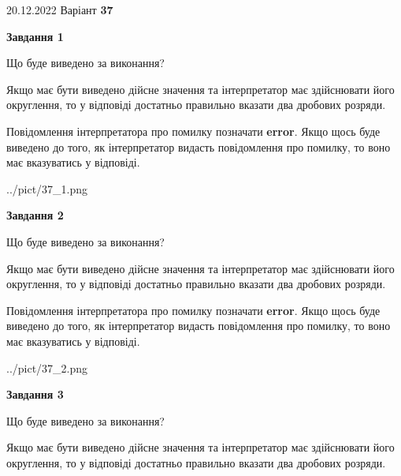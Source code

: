 \documentclass[12pt, ukrainian]{article}
\begin{document}
{20.12.2022 Варіант \No \textbf { 37 }\par}
{
\begin {Large}

{\begin {center}\textbf{Завдання 1}\end {center}}\par
Що буде виведено за виконання? \par

Якщо має бути виведено дійсне значення та інтерпретатор має здійснювати його округлення, 
то у відповіді достатньо правильно вказати два дробових розряди.

Повідомлення інтерпретатора про помилку позначати \textbf{error}.
Якщо щось буде виведено до того, як інтерпретатор видасть повідомлення про помилку, 
то воно має вказуватись у відповіді. \par

\begin{center}
	{../pict/37_1.png}
\end{center}
\newpage

{\begin {center}\textbf{Завдання 2}\end {center}}\par
Що буде виведено за виконання? \par

Якщо має бути виведено дійсне значення та інтерпретатор має здійснювати його округлення, 
то у відповіді достатньо правильно вказати два дробових розряди.

Повідомлення інтерпретатора про помилку позначати \textbf{error}.
Якщо щось буде виведено до того, як інтерпретатор видасть повідомлення про помилку, 
то воно має вказуватись у відповіді. \par

\begin{center}
	{../pict/37_2.png}
\end{center}
\newpage

{\begin {center}\textbf{Завдання 3}\end {center}}\par
Що буде виведено за виконання? \par

Якщо має бути виведено дійсне значення та інтерпретатор має здійснювати його округлення, 
то у відповіді достатньо правильно вказати два дробових розряди.


\end{Large}}
\end{document}
